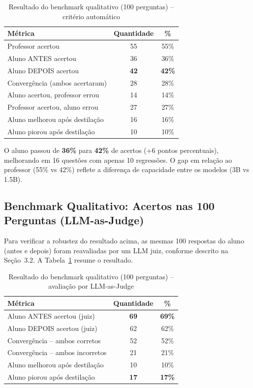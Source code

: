 \documentclass[12pt, a4paper]{article}
\begin{document}
\begin{table}[H]
\centering
\caption{Resultado do benchmark qualitativo (100 perguntas) -- critério automático}
\begin{tabular}{lcc}
\toprule
\textbf{Métrica} & \textbf{Quantidade} & \textbf{\%} \\
\midrule
Professor acertou              & 55 & 55\% \\
Aluno ANTES acertou            & 36 & 36\% \\
\rowcolor{lightgreen}
Aluno DEPOIS acertou           & \textbf{42} & \textbf{42\%} \\
\midrule
Convergência (ambos acertaram) & 28 & 28\% \\
Aluno acertou, professor errou & 14 & 14\% \\
Professor acertou, aluno errou & 27 & 27\% \\
\midrule
\rowcolor{lightgreen}
Aluno melhorou após destilação & 16 & 16\% \\
\rowcolor{lightred}
Aluno piorou após destilação   & 10 & 10\% \\
\bottomrule
\end{tabular}
\end{table}

O aluno passou de \textbf{36\%} para \textbf{42\%} de acertos (+6 pontos percentuais),
melhorando em 16 questões com apenas 10 regressões. O gap em relação ao professor
(55\% vs 42\%) reflete a diferença de capacidade entre os modelos (3B vs 1.5B).

\subsection{Benchmark Qualitativo: Acertos nas 100 Perguntas (LLM-as-Judge)}

Para verificar a robustez do resultado acima, as mesmas 100 respostas do aluno
(antes e depois) foram reavaliadas por um LLM juiz, conforme descrito na
Seção~3.2. A Tabela~\ref{tab:llm-judge} resume o resultado.

\begin{table}[H]
\centering
\caption{Resultado do benchmark qualitativo (100 perguntas) -- avaliação por LLM-as-Judge}
\label{tab:llm-judge}
\begin{tabular}{lcc}
\toprule
\textbf{Métrica} & \textbf{Quantidade} & \textbf{\%} \\
\midrule
\rowcolor{lightgreen}
Aluno ANTES acertou (juiz)      & \textbf{69} & \textbf{69\%} \\
Aluno DEPOIS acertou (juiz)     & 62 & 62\% \\
\midrule
Convergência -- ambos corretos    & 52 & 52\% \\
Convergência -- ambos incorretos  & 21 & 21\% \\
Aluno melhorou após destilação   & 10 & 10\% \\
\rowcolor{lightred}
Aluno piorou após destilação     & \textbf{17} & \textbf{17\%} \\
\bottomrule
\end{tabular}
\end{table}
\end{document}
